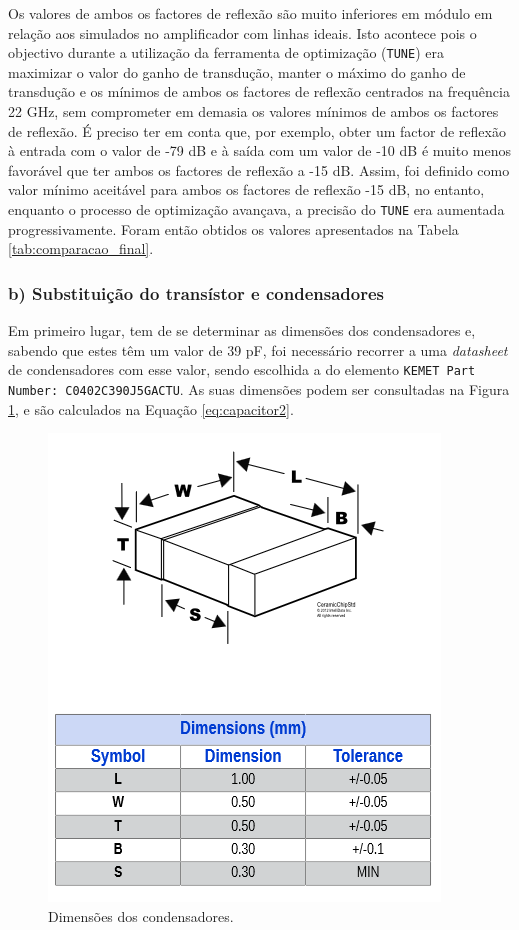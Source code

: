 \documentclass[11pt]{article}
\numberwithin{equation}{section}
\begin{document}
Os valores de ambos os factores de reflexão são muito inferiores em módulo em relação aos simulados no amplificador com linhas ideais. Isto acontece pois o objectivo durante a utilização da ferramenta de optimização (\texttt{TUNE}) era maximizar o valor do ganho de transdução, manter o máximo do ganho de transdução e os mínimos de ambos os factores de reflexão centrados na frequência 22 GHz, sem comprometer em demasia os valores mínimos de ambos os factores de reflexão. É preciso ter em conta que, por exemplo, obter um factor de reflexão à entrada com o valor de -79 dB e à saída com um valor de -10 dB é muito menos favorável que ter ambos os factores de reflexão a -15 dB. Assim, foi definido como valor mínimo aceitável para ambos os factores de reflexão -15 dB, no entanto, enquanto o processo de optimização avançava, a precisão do \texttt{TUNE} era aumentada progressivamente. Foram então obtidos os valores apresentados na Tabela \ref{tab:comparacao_final}.

\subsubsection{b) Substituição do transístor e condensadores}

Em primeiro lugar, tem de se determinar as dimensões dos condensadores e, sabendo que estes têm um valor de 39 pF, foi necessário recorrer a uma \textit{datasheet} de condensadores com esse valor, sendo escolhida a do elemento \texttt{KEMET Part Number: C0402C390J5GACTU}. As suas dimensões podem ser consultadas na Figura \ref{fig:capacitor}, e são calculados na Equação \ref{eq:capacitor2}.

\begin{figure}[H]
	\centering
	\includegraphics[keepaspectratio=true, scale=0.45]{teoricas/capacitor}
	\vspace{-0.5em}
	\caption{Dimensões dos condensadores.}
	\vspace{-9mm}
	\label{fig:capacitor}
\end{figure}
\end{document}

